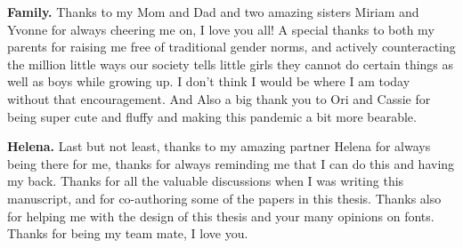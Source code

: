 \textbf{Family.} Thanks to my Mom and Dad and two amazing sisters Miriam and Yvonne for always cheering me on, I love you all! A special thanks to both my parents for raising me free of traditional gender norms, and actively counteracting the million little ways our society tells little girls they cannot do certain things as well as boys while growing up. I don't think I would be where I am today without that encouragement.
And Also a big thank you to Ori and Cassie for being super cute and fluffy and making this pandemic a bit more bearable.


\textbf{Helena.} Last but not least, thanks to my amazing partner Helena for always being there for me, thanks for always reminding me that I can do this and having my back. Thanks for all the valuable discussions when I was writing this manuscript, and for co-authoring some of the papers in this thesis. Thanks also for helping me with the design of this thesis and your many opinions on fonts. Thanks for being my team mate, I love you.
